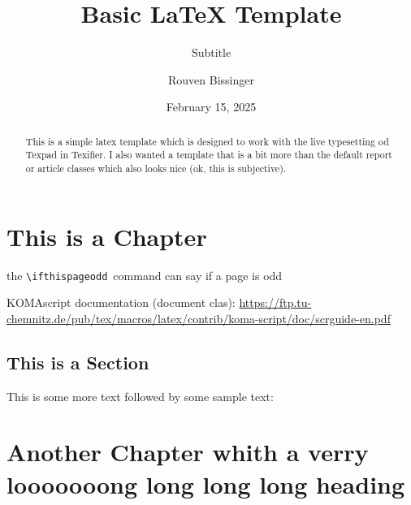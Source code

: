 \documentclass[11pt,version=last]{scrreprt} %
\title{Basic LaTeX Template}
\author{Rouven Bissinger}
\date{February 15, 2025} %
\begin{document}
\subtitle{Subtitle}
\publishers{Adviser Prof. John Doe}



\maketitle

\begin{abstract}
This is a simple latex template which is designed to work with the live typesetting od Texpad in Texifier. I also wanted a template that is a bit more than the default report or article classes which also looks nice (ok, this is subjective).
\end{abstract}

\tableofcontents
    \chapter{This is a Chapter}
    the \texttt{\textbackslash ifthispageodd}\ command can say if a page is odd 
    
     KOMAscript documentation (document clas): \url{https://ftp.tu-chemnitz.de/pub/tex/macros/latex/contrib/koma-script/doc/scrguide-en.pdf}
    
    
    \section{This is a Section}
    
   
    
    
    This is some more text followed by some sample text:
    
    \lipsum[1-3]
    
    \chapter[short version of another chapter]{Another Chapter whith a verry looooooong long long long heading}
    \lipsum[10-20]
    
\end{document}
